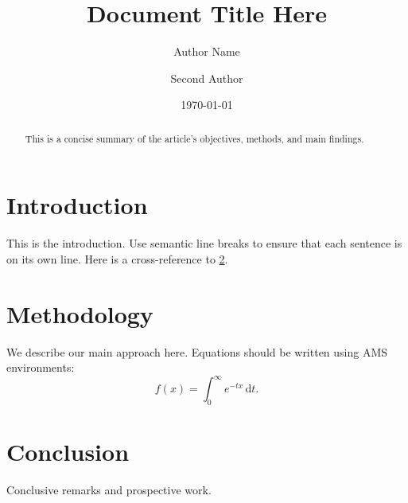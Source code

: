 \documentclass[11pt,a4paper]{article}
\title{\textbf{Document Title Here}}
\author{Author Name \and Second Author}
\date{\today}
\begin{document}
\maketitle

\begin{abstract}
This is a concise summary of the article's objectives, methods, and main findings.
\end{abstract}

\section{Introduction}
\label{sec:introduction}
This is the introduction.
Use semantic line breaks to ensure that each sentence is on its own line.
Here is a cross-reference to \cref{sec:methodology}.

\section{Methodology}
\label{sec:methodology}
We describe our main approach here.
Equations should be written using AMS environments:
\begin{equation}
  \label{eq:sample_formula}
  f(x) = \int_{0}^{\infty} e^{-t x} \, \mathrm{d}t.
\end{equation}

\section{Conclusion}
\label{sec:conclusion}
Conclusive remarks and prospective work.

\end{document}
